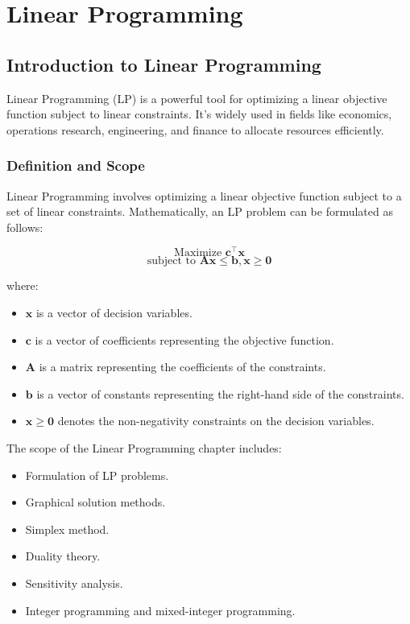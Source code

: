 \documentclass[12pt]{book} %
\begin{document}
\chapter{Linear Programming}

\section{Introduction to Linear Programming}

Linear Programming (LP) is a powerful tool for optimizing a linear objective function subject to linear constraints. It's widely used in fields like economics, operations research, engineering, and finance to allocate resources efficiently.

\subsection{Definition and Scope}

Linear Programming involves optimizing a linear objective function subject to a set of linear constraints. Mathematically, an LP problem can be formulated as follows:

\[
\text{Maximize } \mathbf{c}^\top \mathbf{x}
\]
\[
\text{subject to } \mathbf{Ax} \leq \mathbf{b}, \mathbf{x} \geq \mathbf{0}
\]

where:
\begin{itemize}
    \item $\mathbf{x}$ is a vector of decision variables.
    \item $\mathbf{c}$ is a vector of coefficients representing the objective function.
    \item $\mathbf{A}$ is a matrix representing the coefficients of the constraints.
    \item $\mathbf{b}$ is a vector of constants representing the right-hand side of the constraints.
    \item $\mathbf{x} \geq \mathbf{0}$ denotes the non-negativity constraints on the decision variables.
\end{itemize}

The scope of the Linear Programming chapter includes:

\begin{itemize}
    \item Formulation of LP problems.
    \item Graphical solution methods.
    \item Simplex method.
    \item Duality theory.
    \item Sensitivity analysis.
    \item Integer programming and mixed-integer programming.
\end{itemize}
\end{document}
